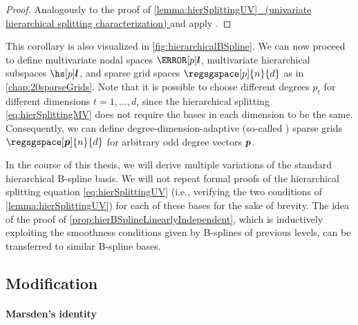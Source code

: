 \begin{proof}
  Analogously to the proof of
  \hyperlink{lemma:hierSplittingUV}{%
    \cref*{lemma:hierSplittingUV}~%
    (univariate hierarchical splitting characterization)%
  }
  and apply .
\end{proof}

\vspace{1em}

This corollary is also visualized in \cref{fig:hierarchicalBSpline}.
We can now proceed to define
multivariate nodal spaces $\nsbspl{\*l}{p}$,
multivariate hierarchical subspaces $\hsbspl{\*l}{p}$, and
sparse grid spaces $\regsgspace[p]{n}{d}$ as in \cref{chap:20sparseGrids}.
Note that it is possible to choose different degrees $p_t$ for
different dimensions $t = 1, \dotsc, d$,
since the hierarchical splitting \eqref{eq:hierSplittingMV} does not
require the bases in each dimension to be the same.
Consequently, we can define degree-dimension-adaptive
(so-called ) sparse grids
$\regsgspace[\*p]{n}{d}$ for arbitrary odd degree vectors ${\boldsymbol{p}}$.

In the course of this thesis, we will derive multiple variations
of the standard hierarchical B-spline basis.
We will not repeat formal proofs of the hierarchical splitting equation
\eqref{eq:hierSplittingUV}
(i.e., verifying the two conditions of \cref{lemma:hierSplittingUV})
for each of these bases for the sake of brevity.
The idea of the proof of \cref{prop:hierBSplineLinearlyIndependent},
which is inductively exploiting the smoothness conditions given by
B-splines of previous levels, can be transferred to similar B-spline
bases.



\subsection{Modification}
\label{sec:313modification}

\paragraph{Marsden's identity}


